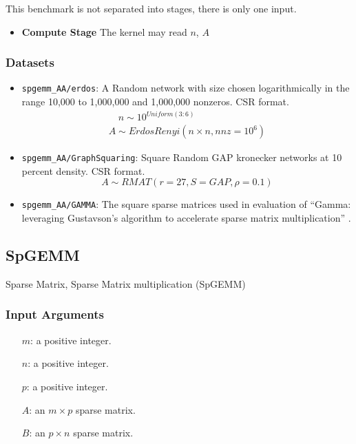 \documentclass{article}
\begin{document}
This benchmark is not separated into stages, there is only one input.

\begin{itemize}
\item \textbf{Compute Stage}
	The kernel may read $n$, $A$
\end{itemize}

\subsubsection{Datasets}

\begin{itemize}
	\item \texttt{spgemm\_AA/erdos}: A Random network with size chosen logarithmically in the range 10,000 to 1,000,000 and 1,000,000 nonzeros. CSR format.
	\begin{multline*}
		\quad n \sim 10^{Uniform(3:6)} \\
			A \sim ErdosRenyi\left(n\times n, nnz=10^6\right)
	\end{multline*}
	\item \texttt{spgemm\_AA/GraphSquaring}: Square Random GAP kronecker networks at 10 percent density. CSR format.
	\[
		A \sim RMAT\left(r=27, S = GAP, \rho = 0.1\right)
	\]
	\item \texttt{spgemm\_AA/GAMMA}: The square sparse matrices used in evaluation of
	``Gamma: leveraging Gustavson’s algorithm to accelerate sparse matrix multiplication'' \cite{zhang_gamma_2021}.
\end{itemize}

\subsection{SpGEMM}
Sparse Matrix, Sparse Matrix multiplication (SpGEMM)
\subsubsection{Input Arguments}

\begin{itemize}
	\item[$m$:] a positive integer.
	\item[$n$:] a positive integer.
	\item[$p$:] a positive integer.
	\item[$A$:] an $m \times p$ sparse matrix.
	\item[$B$:] an $p \times n$ sparse matrix.
\end{itemize}
\end{document}
